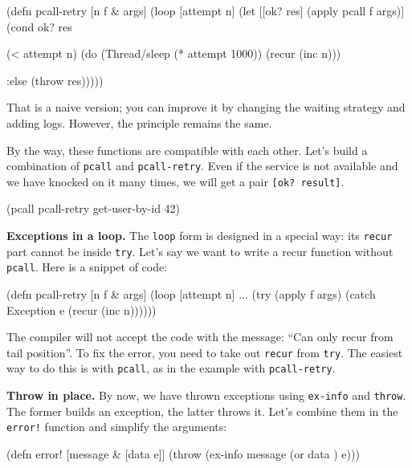 \else

\begin{clojure}
(defn pcall-retry [n f & args]
  (loop [attempt n]
    (let [[ok? res] (apply pcall f args)]
      (cond
        ok? res

        (< attempt n)
        (do (Thread/sleep (* attempt 1000))
            (recur (inc n)))

        :else (throw res)))))
\end{clojure}

\fi

That is a naive version; you can improve it by changing the waiting strategy and adding logs. However, the principle remains the same.

By the way, these functions are compatible with each other. Let's build a combination of \verb|pcall| and \verb|pcall-retry|. Even if the service is not available and we have knocked on it many times, we will get a pair \verb|[ok? result]|.

\begin{clojure}
(pcall pcall-retry get-user-by-id 42)
\end{clojure}

\textbf{ Exceptions in a loop.} The \verb|loop| form is designed in a special way: its \verb|recur| part cannot be inside \verb|try|. Let's say we want to write a recur function without \verb|pcall|. Here is a snippet of code:


\begin{clojure}
(defn pcall-retry [n f & args]
  (loop [attempt n]
    ...
    (try
      (apply f args)
      (catch Exception e
        (recur (inc n))))))
\end{clojure}

The compiler will not accept the code with the message: ``Can only recur from tail position''. To fix the error, you need to take out \verb|recur| from \verb|try|. The easiest way to do this is with \verb|pcall|, as in the example with \verb|pcall-retry|.

\textbf{Throw in place.} By now, we have thrown exceptions using \verb|ex-info| and \verb|throw|. The former builds an exception, the latter throws it. Let's combine them in the \verb|error!| function and simplify the arguments:


\ifx\DEVICETYPE\MOBILE

\begin{clojure}
(defn error! [message & [data e]]
  (throw (ex-info message
           (or data {}) e)))
\end{clojure}

